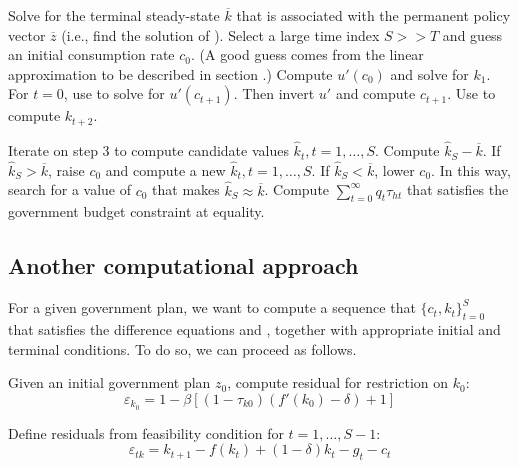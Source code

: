 %
\medskip
{}  Solve  for the terminal steady-state $\overline k$
that is associated with the permanent policy vector $\overline z$
(i.e., find the solution of ).
\medskip
{} Select a large time index $S > > T$ and guess an initial
consumption rate $c_0$.  (A good guess comes from
the linear approximation to be described in section .)
Compute $u'(c_0)$ and solve
 for $k_1$.
\medskip
{}  For $t=0$, use  to solve for $u'(c_{t+1})$.
Then invert $u'$ and compute $c_{t+1}$.   Use  to compute
$k_{t+2}$.

\medskip
{} Iterate on step 3 to compute candidate values
$\hat k_t, t=1, \ldots, S$.
\medskip
{}  Compute $  \hat k_S -\overline k$.
\medskip
{}  If $\hat k_S > \overline k$, raise $c_0$ and compute a new
$\hat k_t, t=1, \ldots, S$.
\medskip
{}  If $\hat k_S < \overline k$, lower $c_0$.
\medskip
{} In this way, search for a value of $c_0$ that makes
$\hat k_S \approx \overline k$.
\medskip
{} Compute $\sum_{t=0}^\infty q_t \tau_{ht}$ that satisfies the
government budget constraint at equality.


\subsection{Another computational approach}

For a given government plan, we want to compute  a sequence that $\{c_t, k_t\}_{t=0}^{S}$
that satisfies the difference equations   and , together with appropriate initial and terminal conditions.
To do so, we can proceed as follows.

\medskip
{} 
Given an initial government plan $z_0$, 
compute residual for restriction   on  $k_0$:
$$
\varepsilon_{k_0} = 1 - \beta \left[ (1 - \tau_{k0}) \left(f'(k_0) - \delta \right) + 1 \right]
$$

\medskip
{} Define residuals from feasibility  condition   for $t = 1, \dots, S-1$:
$$
\varepsilon_{tk} = k_{t+1} - f(k_t) + (1 - \delta)k_t - g_t - c_t
$$
\medskip


